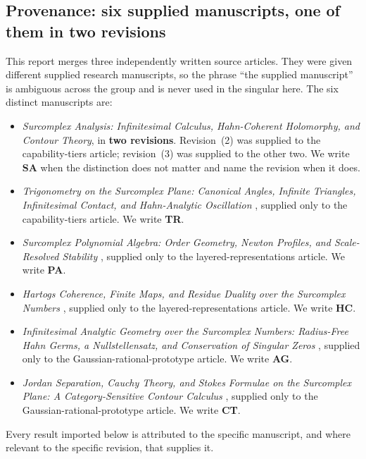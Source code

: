 \documentclass[11pt,letterpaper]{article}
\numberwithin{equation}{section}
\theoremstyle{definition}
\theoremstyle{remark}
\begin{document}
\subsection{Provenance: six supplied manuscripts, one of them in two revisions}
\label{cas:sub-provenance}
This report merges three independently written source articles. They were given
different supplied research manuscripts, so the phrase ``the supplied
manuscript'' is ambiguous across the group and is never used in the singular
here. The six distinct manuscripts are:
\begin{itemize}
\item \emph{Surcomplex Analysis: Infinitesimal Calculus, Hahn-Coherent
Holomorphy, and Contour Theory}, in \textbf{two revisions}. Revision~(2)
\cite{cas:SourceAnalysisTwo} was supplied to the capability-tiers article;
revision~(3) \cite{cas:SourceAnalysisThree} was supplied to the other two. We
write \textbf{SA} when the distinction does not matter and name the revision
when it does.
\item \emph{Trigonometry on the Surcomplex Plane: Canonical Angles, Infinite
Triangles, Infinitesimal Contact, and Hahn-Analytic Oscillation}
\cite{cas:SourceTrig}, supplied only to the capability-tiers article. We write
\textbf{TR}.
\item \emph{Surcomplex Polynomial Algebra: Order Geometry, Newton Profiles, and
Scale-Resolved Stability} \cite{cas:SourcePolynomial}, supplied only to the
layered-representations article. We write \textbf{PA}.
\item \emph{Hartogs Coherence, Finite Maps, and Residue Duality over the
Surcomplex Numbers} \cite{cas:SourceResearch}, supplied only to the
layered-representations article. We write \textbf{HC}.
\item \emph{Infinitesimal Analytic Geometry over the Surcomplex Numbers:
Radius-Free Hahn Germs, a Nullstellensatz, and Conservation of Singular Zeros}
\cite{cas:SourceAG}, supplied only to the Gaussian-rational-prototype article.
We write \textbf{AG}.
\item \emph{Jordan Separation, Cauchy Theory, and Stokes Formulae on the
Surcomplex Plane: A Category-Sensitive Contour Calculus} \cite{cas:SourceCT},
supplied only to the Gaussian-rational-prototype article. We write \textbf{CT}.
\end{itemize}
Every result imported below is attributed to the specific manuscript, and where
relevant to the specific revision, that supplies it.
\end{document}
